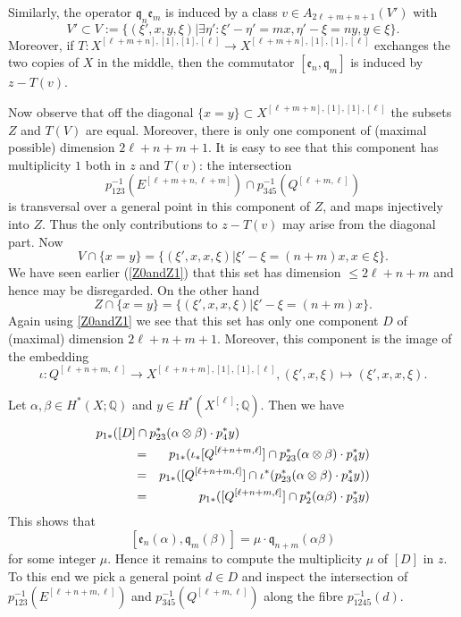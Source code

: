 \documentclass[twoside,11pt]{article}
\newcommand{\IQ}{{\mathbb Q}}
\newcommand{\gothe}{{\mathfrak e}}
\newcommand{\gothq}{{\mathfrak q}}
\newcommand{\tensor}{\otimes}
\newcommand{\ee}{\gothe}
\newcommand{\qq}{\gothq}
\newcommand{\lra}{\longrightarrow}
\begin{document}
Similarly, the operator $\qq_n\ee_m$ is induced by a class
$v\in A_{2\ell+m+n+1}(V')$ with
$$V'\subset V:=\{(\xi',x,y,\xi)|\exists \eta':\xi'-\eta'=mx, \eta'-\xi=ny, y\in\xi\}.$$
Moreover, if $T:X^{[\ell+m+n],[1],[1],[\ell]}\lra X^{[\ell+m+n],[1],[1],[\ell]}$
exchanges the two copies of $X$ in the middle, then the commutator
$[\ee_n,\qq_m]$ is induced by $z-T(v)$.

Now observe that off the diagonal $\{x=y\}\subset X^{[\ell+m+n],[1],[1],[\ell]}$
the subsets $Z$ and $T(V)$ are equal. Moreover, there is only one component
of (maximal possible) dimension $2\ell+n+m+1$. It is easy to see that this
component has multiplicity $1$ both in $z$ and $T(v)$: the intersection
$$p_{123}^{-1}(E^{[\ell+m+n,\ell+m]})\cap
p_{345}^{-1}(Q^{[\ell+m,\ell]})$$
is transversal over a general point in this component of $Z$, and maps injectively into $Z$. 
Thus the only contributions to $z-T(v)$ may arise from 
the diagonal part. Now 
$$V\cap\{x=y\}=\{(\xi',x,x,\xi)|\xi'-\xi=(n+m)x, x\in \xi\}.$$
We have seen earlier (\ref{Z0andZ1})
that this set has dimension $\leq 2\ell+n+m$ and hence may be disregarded.
On the other hand
$$Z\cap\{x=y\}=\{(\xi',x,x,\xi)|\xi'-\xi=(n+m)x\}.$$
Again using \ref{Z0andZ1} we see that this set has only one component $D$ of
(maximal) dimension $2\ell+n+m+1$. Moreover, this component is the
image of the embedding
$$\iota:Q^{[\ell+n+m,\ell]}\to X^{[\ell+n+m],[1],[1],[\ell]}, (\xi',x,\xi)\mapsto (\xi',x,x,\xi).$$

Let $\alpha,\beta\in H^*(X;\IQ)$ and $y\in H^*(X^{[\ell]};\IQ)$. Then we have
\begin{eqnarray*}
\lefteqn{p_{1*}([D]\cap p_{23}^*(\alpha\tensor\beta)\cdot
p_4^* y)
}\hspace{3em}\\
&=&
p_{1*}(\iota_*[Q^{[\ell+n+m,\ell]}]\cap p_{23}^*(\alpha\tensor\beta)\cdot
p_4^* y)\\
&=&
p_{1*}([Q^{[\ell+n+m,\ell]}]\cap \iota^*(p_{23}^*(\alpha\tensor\beta)\cdot p_4^*y))\\
&=&p_{1*}([Q^{[\ell+n+m,\ell]}]\cap p_2^*(\alpha\beta)\cdot p_3^*y)
\end{eqnarray*}
This shows that 
$$[\ee_n(\alpha),\qq_m(\beta)]=\mu\cdot\qq_{n+m}(\alpha\beta)$$
for some integer $\mu$.
Hence it remains to compute the multiplicity $\mu$ of $[D]$ in $z$.
To this end we pick a general point $d\in D$ and inspect the 
intersection of $p_{123}^{-1}(E^{[\ell+n+m,\ell]})$ and
$p_{345}^{-1}(Q^{[\ell+m,\ell]})$ along the fibre $p_{1245}^{-1}(d)$.
\end{document}
